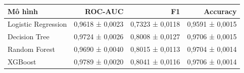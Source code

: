 \begin{tabular}{lrrr}
\toprule
Mô hình & ROC-AUC & F1 & Accuracy \\
\midrule
Logistic Regression & 0{,}9618 ± 0{,}0023 & 0{,}7323 ± 0{,}0118 & 0{,}9591 ± 0{,}0015 \\
Decision Tree & 0{,}9724 ± 0{,}0026 & 0{,}8008 ± 0{,}0127 & 0{,}9706 ± 0{,}0015 \\
Random Forest & 0{,}9690 ± 0{,}0040 & 0{,}8015 ± 0{,}0113 & 0{,}9704 ± 0{,}0014 \\
XGBoost & 0{,}9789 ± 0{,}0020 & 0{,}8041 ± 0{,}0116 & 0{,}9706 ± 0{,}0014 \\
\bottomrule
\end{tabular}
